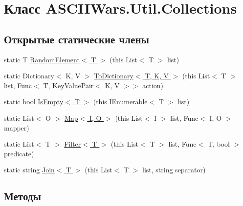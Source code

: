 \hypertarget{class_a_s_c_i_i_wars_1_1_util_1_1_collections}{}\section{Класс A\+S\+C\+I\+I\+Wars.\+Util.\+Collections}
\label{class_a_s_c_i_i_wars_1_1_util_1_1_collections}
\subsection*{Открытые статические члены}
\begin{DoxyCompactItemize}
\item 
static T \hyperlink{class_a_s_c_i_i_wars_1_1_util_1_1_collections_a7d37f6ab83dceac4a738606e81efca9e}{Random\+Element$<$ T $>$} (this List$<$ T $>$ list)
\item 
static Dictionary$<$ K, V $>$ \hyperlink{class_a_s_c_i_i_wars_1_1_util_1_1_collections_a7205c0192f7062841f6d774f3d284736}{To\+Dictionary$<$ T, K, V $>$} (this List$<$ T $>$ list, Func$<$ T, Key\+Value\+Pair$<$ K, V $>$$>$ action)
\item 
static bool \hyperlink{class_a_s_c_i_i_wars_1_1_util_1_1_collections_af9a8a8494797736b55e88f260621af94}{Is\+Empty$<$ T $>$} (this I\+Enumerable$<$ T $>$ list)
\item 
static List$<$ O $>$ \hyperlink{class_a_s_c_i_i_wars_1_1_util_1_1_collections_a16737b03d935bccbcba44eca76f2a9a2}{Map$<$ I, O $>$} (this List$<$ I $>$ list, Func$<$ I, O $>$ mapper)
\item 
static List$<$ T $>$ \hyperlink{class_a_s_c_i_i_wars_1_1_util_1_1_collections_a88d8d525ad481291ef73dc07f06f7957}{Filter$<$ T $>$} (this List$<$ T $>$ list, Func$<$ T, bool $>$ predicate)
\item 
static string \hyperlink{class_a_s_c_i_i_wars_1_1_util_1_1_collections_aa6e33f9e35f12333b99d3bf601d81980}{Join$<$ T $>$} (this List$<$ T $>$ list, string separator)
\end{DoxyCompactItemize}


\subsection{Методы}
\hypertarget{class_a_s_c_i_i_wars_1_1_util_1_1_collections_a88d8d525ad481291ef73dc07f06f7957}{}\label{class_a_s_c_i_i_wars_1_1_util_1_1_collections_a88d8d525ad481291ef73dc07f06f7957} 
